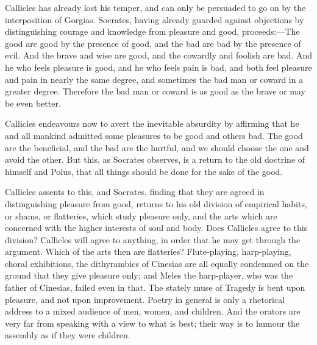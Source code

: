 \documentclass[11pt,letter]{article}
\begin{document}
\par  Callicles has already lost his temper, and can only be persuaded to go on by the interposition of Gorgias. Socrates, having already guarded against objections by distinguishing courage and knowledge from pleasure and good, proceeds:—The good are good by the presence of good, and the bad are bad by the presence of evil. And the brave and wise are good, and the cowardly and foolish are bad. And he who feels pleasure is good, and he who feels pain is bad, and both feel pleasure and pain in nearly the same degree, and sometimes the bad man or coward in a greater degree. Therefore the bad man or coward is as good as the brave or may be even better.

\par  Callicles endeavours now to avert the inevitable absurdity by affirming that he and all mankind admitted some pleasures to be good and others bad. The good are the beneficial, and the bad are the hurtful, and we should choose the one and avoid the other. But this, as Socrates observes, is a return to the old doctrine of himself and Polus, that all things should be done for the sake of the good.

\par  Callicles assents to this, and Socrates, finding that they are agreed in distinguishing pleasure from good, returns to his old division of empirical habits, or shams, or flatteries, which study pleasure only, and the arts which are concerned with the higher interests of soul and body. Does Callicles agree to this division? Callicles will agree to anything, in order that he may get through the argument. Which of the arts then are flatteries? Flute-playing, harp-playing, choral exhibitions, the dithyrambics of Cinesias are all equally condemned on the ground that they give pleasure only; and Meles the harp-player, who was the father of Cinesias, failed even in that. The stately muse of Tragedy is bent upon pleasure, and not upon improvement. Poetry in general is only a rhetorical address to a mixed audience of men, women, and children. And the orators are very far from speaking with a view to what is best; their way is to humour the assembly as if they were children.
\end{document}
